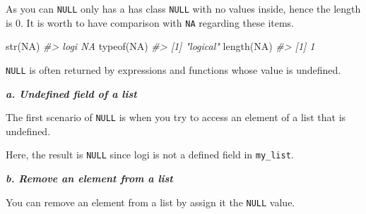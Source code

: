 \documentclass[
]{book}
\newenvironment{Shaded}{\begin{snugshade}}{\end{snugshade}}
\newcommand{\AttributeTok}[1]{\textcolor[rgb]{0.77,0.63,0.00}{#1}}
\newcommand{\CommentTok}[1]{\textcolor[rgb]{0.56,0.35,0.01}{\textit{#1}}}
\newcommand{\ConstantTok}[1]{\textcolor[rgb]{0.00,0.00,0.00}{#1}}
\newcommand{\DecValTok}[1]{\textcolor[rgb]{0.00,0.00,0.81}{#1}}
\newcommand{\FunctionTok}[1]{\textcolor[rgb]{0.00,0.00,0.00}{#1}}
\newcommand{\NormalTok}[1]{#1}
\newcommand{\OtherTok}[1]{\textcolor[rgb]{0.56,0.35,0.01}{#1}}
\newcommand{\SpecialCharTok}[1]{\textcolor[rgb]{0.00,0.00,0.00}{#1}}
\newcommand{\StringTok}[1]{\textcolor[rgb]{0.31,0.60,0.02}{#1}}
\begin{document}
As you can \texttt{NULL} only has a has class \texttt{NULL} with no values inside, hence the length is 0. It is worth to have comparison with \texttt{NA} regarding these items.

\begin{Shaded}
\begin{Highlighting}[]
\FunctionTok{str}\NormalTok{(}\ConstantTok{NA}\NormalTok{)}
\CommentTok{\#\textgreater{}  logi NA}
\FunctionTok{typeof}\NormalTok{(}\ConstantTok{NA}\NormalTok{)}
\CommentTok{\#\textgreater{} [1] "logical"}
\FunctionTok{length}\NormalTok{(}\ConstantTok{NA}\NormalTok{)}
\CommentTok{\#\textgreater{} [1] 1}
\end{Highlighting}
\end{Shaded}

\texttt{NULL} is often returned by expressions and functions whose value is undefined.

\textbf{\emph{a. Undefined field of a list}}

The first scenario of \texttt{NULL} is when you try to access an element of a list that is undefined.

\begin{Shaded}
\end{Shaded}

Here, the result is \texttt{NULL} since logi is not a defined field in \texttt{my\_list}.

\textbf{\emph{b. Remove an element from a list}}

You can remove an element from a list by assign it the \texttt{NULL} value.

\begin{Shaded}
\end{Shaded}
\end{document}
